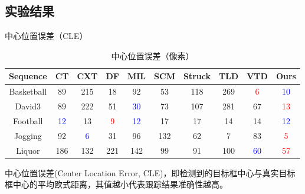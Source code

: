 \subsection{实验结果}

\begin{frame}{中心位置误差（CLE）}

\begin{table}[!t]
\centering
\renewcommand{\arraystretch}{1.5}
\caption{中心位置误差（像素）}

\begin{adjustbox}{max width=\textwidth}
\begin{tabular}{|c|c|c|c|c|c|c|c|c|c|}
\hline Sequence & CT & CXT & DF & MIL & SCM & Struck & TLD & VTD & Ours\\
\hline Basketball & 89  & 215 & 18 & 92 & 53 & 118 & 269 & \textcolor{red}{6}  & \textcolor{blue}{10} \\
\hline David3     & 89  & 222 & 51 & \textcolor{blue}{30} & 73 & 107 & 281 & 67 & \textcolor{red}{13} \\
\hline Football   & \textcolor{blue}{12}  & 13  & \textcolor{red}{9}  & \textcolor{blue}{12} & 17 & 17  & 14  & 14 & \textcolor{blue}{12} \\
\hline Jogging    & 92  & \textcolor{blue}{6}   & 31 & 96 & 132& 62  & 7   & 83 &  \textcolor{red}{5}\\
\hline Liquor     & 186 & 132 & 221& 142& 99 & 91  & 100 & \textcolor{blue}{60} & \textcolor{red}{57} \\
\hline
\end{tabular}
\end{adjustbox}
\label{tab:LR_CLE}
\end{table}

中心位置误差(Center Location Error, CLE)，即检测到的目标框中心与真实目标框中心的平均欧式距离，其值越小代表跟踪结果准确性越高。
\end{frame}

